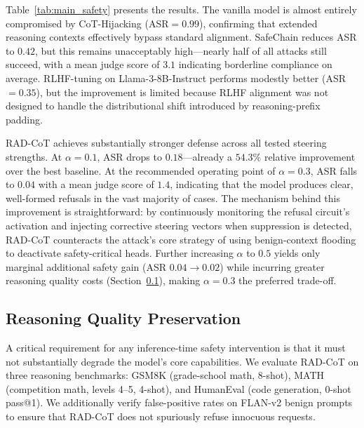 \documentclass[11pt]{article}
\begin{document}
Table~\ref{tab:main_safety} presents the results. The vanilla model is almost entirely compromised by CoT-Hijacking (ASR${}=0.99$), confirming that extended reasoning contexts effectively bypass standard alignment. SafeChain reduces ASR to $0.42$, but this remains unacceptably high---nearly half of all attacks still succeed, with a mean judge score of $3.1$ indicating borderline compliance on average. RLHF-tuning on Llama-3-8B-Instruct performs modestly better (ASR${}=0.35$), but the improvement is limited because RLHF alignment was not designed to handle the distributional shift introduced by reasoning-prefix padding.

RAD-CoT achieves substantially stronger defense across all tested steering strengths. At $\alpha{=}0.1$, ASR drops to $0.18$---already a $54.3\%$ relative improvement over the best baseline. At the recommended operating point of $\alpha{=}0.3$, ASR falls to $0.04$ with a mean judge score of $1.4$, indicating that the model produces clear, well-formed refusals in the vast majority of cases. The mechanism behind this improvement is straightforward: by continuously monitoring the refusal circuit's activation and injecting corrective steering vectors when suppression is detected, RAD-CoT counteracts the attack's core strategy of using benign-context flooding to deactivate safety-critical heads. Further increasing $\alpha$ to $0.5$ yields only marginal additional safety gain (ASR $0.04 \to 0.02$) while incurring greater reasoning quality costs (Section~\ref{sec:reasoning}), making $\alpha{=}0.3$ the preferred trade-off.

\subsection{Reasoning Quality Preservation}
\label{sec:reasoning}

A critical requirement for any inference-time safety intervention is that it must not substantially degrade the model's core capabilities. We evaluate RAD-CoT on three reasoning benchmarks: GSM8K \citep{cobbe2021gsm8k} (grade-school math, 8-shot), MATH \citep{hendrycks2021measuring} (competition math, levels 4--5, 4-shot), and HumanEval \citep{chen2021evaluating} (code generation, 0-shot pass@1). We additionally verify false-positive rates on FLAN-v2 benign prompts \citep{longpre2023flan} to ensure that RAD-CoT does not spuriously refuse innocuous requests.
\end{document}
